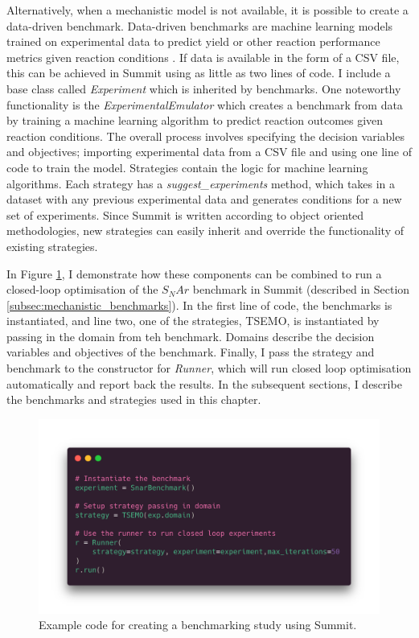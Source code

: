 Alternatively, when a mechanistic model is not available, it is possible to create a data-driven benchmark. Data-driven benchmarks are machine learning models trained on experimental data to predict yield or other reaction performance metrics given reaction conditions \cite{Hase2020a}.  If data is available in the form of a CSV file, this can be achieved in Summit using as little as two lines of code. I include a base class called \textit{Experiment} which is inherited by benchmarks. One noteworthy functionality is the \textit{ExperimentalEmulator} which creates a benchmark from data by training a machine learning algorithm to predict reaction outcomes given reaction conditions. The overall process involves specifying the decision variables and objectives; importing experimental data from a CSV file and using one line of code to train the model. Strategies contain the logic for machine learning algorithms. Each strategy has a \textit{suggest\_experiments} method, which takes in a dataset with any previous experimental data and generates conditions for a new set of experiments.  Since Summit is written according to object oriented methodologies, new strategies can easily inherit and override the functionality of existing strategies.

In Figure \ref{fig:code_example}, I demonstrate how these components can be combined to run a closed-loop optimisation of the $S_NAr$ benchmark in Summit (described in Section \ref{subsec:mechanistic_benchmarks}). In the first line of code, the benchmarks is instantiated, and line two, one of the strategies, TSEMO, is instantiated by passing in the domain from teh benchmark. Domains describe the decision variables and objectives of the benchmark. Finally, I pass the strategy and benchmark to the constructor for \textit{Runner}, which will run closed loop optimisation automatically and report back the results. In the subsequent sections, I describe the benchmarks and strategies used in this chapter.

\begin{figure}
    \centering
    \includegraphics[width=\textwidth]{gfx/Chapter03/paraiso.png}
    \caption{Example code for creating a benchmarking study using Summit.}
    \label{fig:code_example}
\end{figure}



